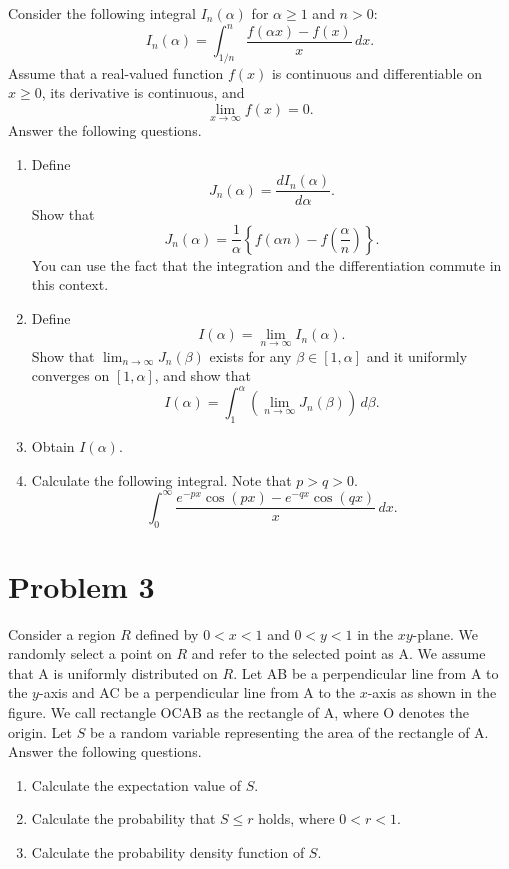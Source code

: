 \documentclass[10pt,a4paper]{article}
\begin{document}
Consider the following integral $I_n(\alpha)$ for $\alpha\geq 1$ and $n>0$:
\[
  I_n(\alpha)=\int_{1/n}^{n}\frac{f(\alpha x)-f(x)}{x}\,dx.
\]
Assume that a real-valued function $f(x)$ is continuous and differentiable on $x\geq 0$, its derivative is continuous, and
\[
  \lim_{x\to\infty}f(x)=0.
\]
Answer the following questions.

\begin{enumerate}
  \item Define
        \[
          J_n(\alpha)=\frac{dI_n(\alpha)}{d\alpha}.
        \]
        Show that
        \[
          J_n(\alpha)=\frac{1}{\alpha}
          \left\{f(\alpha n)-f\left(\frac{\alpha}{n}\right)\right\}.
        \]
        You can use the fact that the integration and the differentiation commute in this context.

  \item Define
        \[
          I(\alpha)=\lim_{n\to\infty}I_n(\alpha).
        \]
        Show that $\lim_{n\to\infty}J_n(\beta)$ exists for any $\beta\in[1,\alpha]$ and it uniformly converges on $[1,\alpha]$, and show that
        \[
          I(\alpha)=\int_1^\alpha
          \left(\lim_{n\to\infty}J_n(\beta)\right)\,d\beta.
        \]

  \item Obtain $I(\alpha)$.

  \item Calculate the following integral. Note that $p>q>0$.
        \[
          \int_0^\infty
          \frac{e^{-px}\cos(px)-e^{-qx}\cos(qx)}{x}\,dx.
        \]
\end{enumerate}

\section*{Problem 3}

Consider a region $R$ defined by $0<x<1$ and $0<y<1$ in the $xy$-plane. We randomly select a point on $R$ and refer to the selected point as A. We assume that A is uniformly distributed on $R$. Let AB be a perpendicular line from A to the $y$-axis and AC be a perpendicular line from A to the $x$-axis as shown in the figure. We call rectangle OCAB as the rectangle of A, where O denotes the origin. Let $S$ be a random variable representing the area of the rectangle of A. Answer the following questions.

\begin{enumerate}
  \item Calculate the expectation value of $S$.

  \item Calculate the probability that $S\leq r$ holds, where $0<r<1$.

  \item Calculate the probability density function of $S$.
\end{enumerate}
\end{document}
